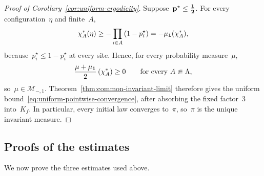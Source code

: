 \begin{proof}[Proof of Corollary~\ref{cor:uniform-ergodicity}]
Suppose~$\mathbf{p}^\star\leq\boldsymbol{\tfrac12}$. For every configuration~$\eta$ and
finite~$A$,
\begin{equation*}
\chi_A^*(\eta)
\geq
-\prod_{i\in A}\left(1-p_i^\star\right)
=
-\mu_{\mathbf{1}}(\chi_A^*),
\end{equation*}
because~$p_i^\star\leq1-p_i^\star$ at every site. Hence, for every probability
measure~$\mu$,
\begin{equation*}
\frac{\mu+\mu_{\mathbf{1}}}2\left(\chi_A^*\right)\geq0
\qquad
\text{for every }A\Subset\Lambda,
\end{equation*}
so~$\mu\in\mathcal M_{-,1}$. Theorem~\ref{thm:common-invariant-limit} therefore
gives the uniform bound~\eqref{eq:uniform-pointwise-convergence}, after
absorbing the fixed factor~$3$ into~$K_f$. In particular, every initial law
converges to~$\pi$, so~$\pi$ is the unique invariant measure.
\end{proof}

\subsection{Proofs of the estimates}
\label{subsec:convergence-estimate-proofs}

We now prove the three estimates used above.

